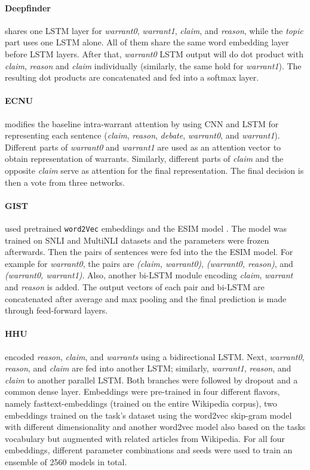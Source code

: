 \paragraph{Deepfinder}
shares one LSTM layer for \emph{warrant0}, \emph{warrant1}, \emph{claim}, and \emph{reason}, while the \emph{topic} part uses one LSTM alone. All of them share the same word embedding layer before LSTM layers. After that, \emph{warrant0} LSTM output will do dot product with \emph{claim}, \emph{reason} and \emph{claim} individually (similarly, the same hold for \emph{warrant1}). The resulting dot products are concatenated and fed into a softmax layer.


\paragraph{ECNU}
modifies the baseline intra-warrant attention \cite{habernal.et.al.2018.NAACL.arct} by using CNN and LSTM for representing each sentence (\emph{claim}, \emph{reason}, \emph{debate}, \emph{warrant0}, and \emph{warrant1}). Different parts of \emph{warrant0} and \emph{warrant1} are used as an attention vector to obtain representation of warrants. Similarly, different parts of \emph{claim} and the opposite \emph{claim} serve as attention for the final representation. The final decision is then a vote from three networks.


\paragraph{GIST} used pretrained \texttt{word2Vec} embeddings and the ESIM model \cite{Chen.et.al.2017.ACL.ESIM}. The model was trained on SNLI \cite{Bowman.et.al.2015} and MultiNLI \cite{nangia-EtAl:2017:RepEval} datasets and the parameters were frozen afterwards. Then the pairs of sentences were fed into the the ESIM model. For example for \emph{warrant0}, the pairs are \emph{(claim, warrant0)}, \emph{(warrant0, reason)}, and \emph{(warrant0, warrant1)}. Also, another bi-LSTM module encoding \emph{claim}, \emph{warrant} and \emph{reason} is added. The output vectors of each pair and bi-LSTM are concatenated after average and max pooling and the final prediction is made through feed-forward layers.


\paragraph{HHU}
encoded \emph{reason}, \emph{claim}, and \emph{warrants} using a bidirectional LSTM. Next, \emph{warrant0}, \emph{reason}, and \emph{claim} are fed into another LSTM; similarly, \emph{warrant1}, \emph{reason}, and \emph{claim} to another parallel LSTM. Both branches were followed by dropout and a common dense layer. Embeddings were pre-trained in four different flavors, namely fasttext-embeddings (trained on the entire Wikipedia corpus), two embeddings trained on the task's dataset using the word2vec skip-gram model with different dimensionality and another word2vec model also based on the tasks vocabulary but augmented with related articles from Wikipedia. For all four embeddings, different parameter combinations and seeds were used to train an ensemble of 2560 models in total.


